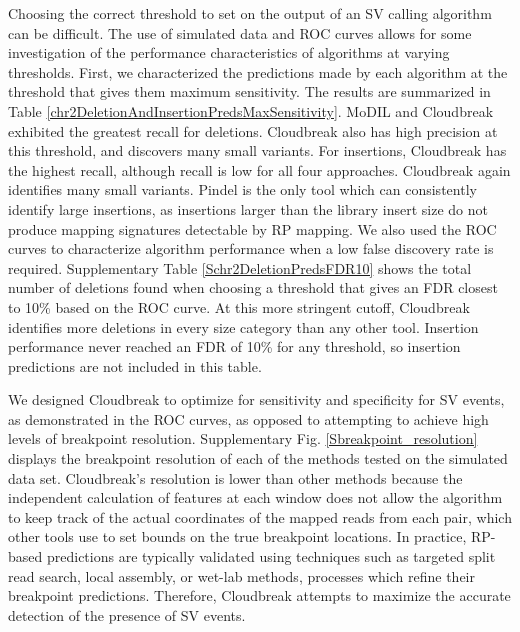 \documentclass{bioinfo}
\newcommand{\todo}[1]{}
\begin{document}
Choosing the correct threshold to set on the output of an SV calling algorithm can be difficult. The use of simulated data and ROC curves allows for some investigation of the performance characteristics of algorithms at varying thresholds. First, we characterized the predictions made by each algorithm at the threshold that gives them maximum sensitivity. \todo{For Cloudbreak we chose an operating point at which marginal improvements in sensitivity became very low.} The results are summarized in Table \ref{chr2DeletionAndInsertionPredsMaxSensitivity}. MoDIL and Cloudbreak exhibited the greatest recall for deletions. Cloudbreak also has high precision at this threshold, and discovers many small variants. For insertions, Cloudbreak has the highest recall, although recall is low for all four approaches. Cloudbreak again identifies many small variants. Pindel is the only tool which can consistently identify large insertions, as insertions larger than the library insert size do not produce mapping signatures detectable by RP mapping. We also used the ROC curves to characterize algorithm performance when a low false discovery rate is required. Supplementary Table \ref{Schr2DeletionPredsFDR10} shows the total number of deletions found when choosing a threshold that gives an FDR closest to 10\% based on the ROC curve. At this more stringent cutoff, Cloudbreak identifies more deletions in every size category than any other tool. Insertion performance never reached an FDR of 10\% for any threshold, so insertion predictions are not included in this table.\todo{ We also examined Cloudbreak's ability to detect events in repetitive regions of the genome, and found that it was similar to the other methods tested (Supplementary Tables \ref{SdeletionRepmaskpreds} and \ref{SinsertionRepmaskpreds}).}

We designed Cloudbreak to optimize for sensitivity and specificity for SV events, as demonstrated in the ROC curves, as opposed to attempting to achieve high levels of breakpoint resolution. Supplementary Fig. \ref{Sbreakpoint_resolution} displays the breakpoint resolution of each of the methods tested on the simulated data set. Cloudbreak's resolution is lower than other methods because the independent calculation of features at each window does not allow the algorithm to keep track of the actual coordinates of the mapped reads from each pair, which other tools use to set bounds on the true breakpoint locations. In practice, RP-based predictions are typically validated using techniques such as targeted split read search, local assembly, or wet-lab methods, processes which refine their breakpoint predictions. Therefore, Cloudbreak attempts to maximize the accurate detection of the presence of SV events.
\end{document}
